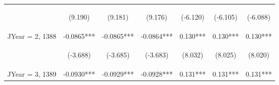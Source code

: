 \documentclass[]{article}
\begin{document}
\begin{center}
\begin{tabular}{lcccccc}
        \vspace{4pt}     & \begin{footnotesize}(9.190)\end{footnotesize}  & \begin{footnotesize}(9.181)\end{footnotesize}  & \begin{footnotesize}(9.176)\end{footnotesize}  & \begin{footnotesize}(-6.120)\end{footnotesize} & \begin{footnotesize}(-6.105)\end{footnotesize} & \begin{footnotesize}(-6.088)\end{footnotesize} \\
        JYear = 2, 1388  & -0.0865***                                     & -0.0865***                                     & -0.0864***                                     & 0.130***                                       & 0.130***                                       & 0.130***                                       \\
        \vspace{4pt}     & \begin{footnotesize}(-3.688)\end{footnotesize} & \begin{footnotesize}(-3.685)\end{footnotesize} & \begin{footnotesize}(-3.683)\end{footnotesize} & \begin{footnotesize}(8.032)\end{footnotesize}  & \begin{footnotesize}(8.025)\end{footnotesize}  & \begin{footnotesize}(8.020)\end{footnotesize}  \\
        JYear = 3, 1389  & -0.0930***                                     & -0.0929***                                     & -0.0928***                                     & 0.131***                                       & 0.131***                                       & 0.131***                                       \\

\end{tabular}
\end{center}
\end{document}

